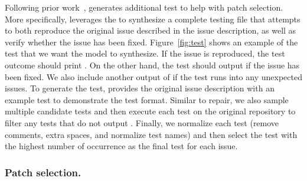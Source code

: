 Following prior work~\cite{specrover, coder}, \tech generates additional \reproduction test to help with patch selection. More specifically, \tech leverages the \llm to synthesize a complete testing file that attempts to both reproduce the original issue described in the issue description, as well as verify whether the issue has been fixed.
 Figure~\ref{fig:test} shows an example of the \reproduction test that we want the model to synthesize. 
 {If the issue is reproduced}, the test outcome should print . 
 On the other hand, the test should output  if the issue has been fixed. 
 We also include another output of  if the test runs into any unexpected issues. 
 To generate the \reproduction test, \tech provides the original issue description with an example \reproduction test to demonstrate the test format.
 Similar to repair, we also sample multiple candidate \reproduction tests and then execute each test on the original repository to filter any tests that do not output . 
 Finally, we normalize each test (remove comments, extra spaces, and normalize test names) and then select the test with the highest number of occurrence as the final \reproduction test for each issue.


\subsubsection{Patch selection.} 
\label{sec:patch_filtering}


